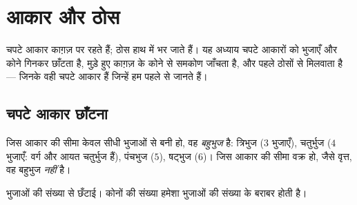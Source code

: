 \chapter{आकार और ठोस}\label{ch:g2:shapes}

चपटे आकार काग़ज़ पर रहते हैं; ठोस हाथ में भर जाते हैं। यह अध्याय
चपटे आकारों को भुजाएँ और कोने गिनकर छाँटता है, मुड़े हुए काग़ज़
के कोने से समकोण जाँचता है, और पहले ठोसों से मिलवाता है ---
जिनके  वही चपटे आकार हैं जिन्हें हम पहले से जानते हैं।

\section{चपटे आकार छाँटना}

\begin{definition}[सीधी भुजाओं वाले और गोल]\label{def:g2:shapes:sort}
जिस आकार की सीमा केवल सीधी भुजाओं से बनी हो, वह
\emph{बहुभुज} है: त्रिभुज ($3$ भुजाएँ), चतुर्भुज ($4$ भुजाएँ:
वर्ग और आयत चतुर्भुज हैं), पंचभुज ($5$), षट्भुज ($6$)।
जिस आकार की सीमा वक्र हो, जैसे वृत्त, वह बहुभुज
\emph{नहीं} है।
\end{definition}

\begin{omfigure}

{\small भुजाओं की संख्या से छँटाई। कोनों की संख्या हमेशा भुजाओं
की संख्या के बराबर होती है।}
\end{omfigure}

